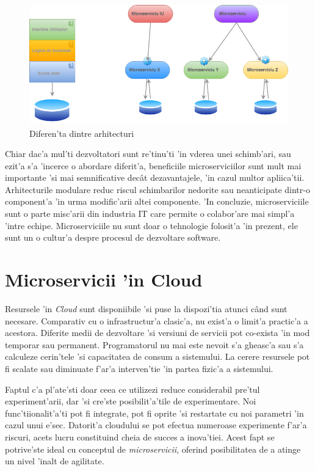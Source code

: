 \documentclass[12pt,a4paper,twoside]{report}
\begin{document}
\begin{figure}[H]
\begin{center}
\advance\leftskip-3cm
\advance\rightskip-3cm
\includegraphics[keepaspectratio=true,scale=0.5]{img/microservices-vs-monolithic.png}
\caption{Diferen'ta dintre arhitecturi}
\label{microservices_vs_monolithic_arch}
\end{center}
\end{figure} 

Chiar dac'a mul'ti dezvoltatori sunt re'tinu'ti 'in vderea unei schimb'ari, sau ezit'a s'a 'incerce o abordare diferit'a, beneficiile microserviciilor sunt mult mai importante 'si mai semnificative decât dezavantajele, 'in cazul multor apliica'tii\cite{art_microservices}.
Arhitecturile modulare reduc riscul schimbarilor nedorite sau neanticipate dintr-o component'a 'in urma modific'arii altei componente. 'In concluzie, microserviciile sunt o parte misc'arii din industria IT care permite o colabor'are mai simpl'a 'intre echipe. Microserviciile nu sunt doar o tehnologie folosit'a 'in prezent, ele sunt un o cultur'a despre procesul de dezvoltare software.

\section{Microservicii 'in Cloud}

Resursele 'in \textit{Cloud} sunt disponiibile 'si puse la dispozi'tia atunci când sunt necesare. Comparativ cu o infrastructur'a clasic'a, nu exist'a o limit'a practic'a a acestora.
Diferite medii de dezvoltare 'si versiuni de servicii pot co-exista 'in mod temporar sau permanent. Programatorul nu mai este nevoit s'a gheasc'a sau s'a calculeze cerin'tele 'si capacitatea de consum a sistemului. La cerere resursele pot fi scalate sau diminuate f'ar'a interven'tie 'in partea fizic'a a sistemului.

Faptul c'a pl'ate'sti doar ceea ce utilizezi reduce considerabil pre'tul experiment'arii, dar 'si cre'ste posibilit'a'tile de experimentare. Noi func'tiionalit'a'ti pot fi integrate, pot fi oprite 'si restartate cu noi parametri 'in cazul unui e'sec. Datorit'a cloudului se pot efectua numeroase experimente f'ar'a riscuri, acets lucru constituind cheia de succes a inova'tiei. Acest fapt se potrive'ste ideal cu conceptul de \textit{microservicii}, oferind posibilitatea de a atinge un nivel 'inalt de agilitate.
\end{document}
